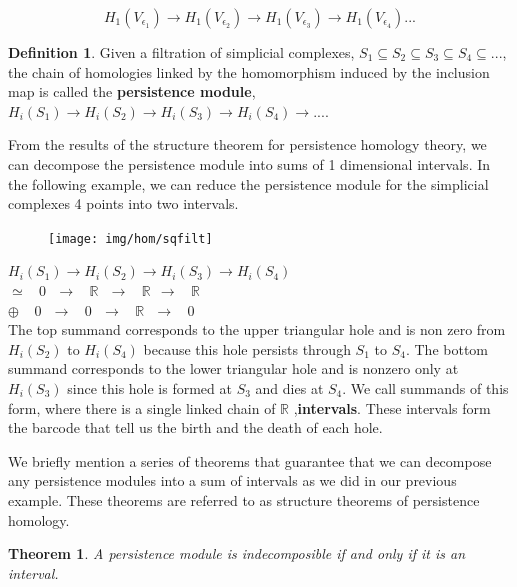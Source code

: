 \documentclass[12pt, a4paper, twocolumn, fullpage]{article}
\theoremstyle{plain}
\newtheorem{thm}{Theorem}[section]
\theoremstyle{definition}
\newtheorem{defn}{Definition}[section]
\theoremstyle{remark}
\begin{document}
 $$ H_1(V_{\epsilon_1}) \rightarrow H_1(V_{\epsilon_2}) \rightarrow H_1(V_{\epsilon_3}) \rightarrow H_1(V_{\epsilon_4}) ...$$
 
\begin{defn}
Given a filtration of simplicial complexes, $S_1 \subseteq S_2 \subseteq S_3 \subseteq S_4 \subseteq ...$, the chain of homologies linked by the homomorphism induced by the inclusion map is called the \textbf{persistence module}, $ H_i(S_1) \rightarrow H_i(S_2) \rightarrow H_i(S_3) \rightarrow H_i(S_4) \rightarrow ...$.
\end{defn}
 
From the results of the structure theorem for persistence homology theory, we can decompose the persistence module into sums of 1 dimensional intervals. In the following example, we can reduce the persistence module for the simplicial complexes 4 points into two intervals.

\begin{figure}[H]
    \texttt{[image: img/hom/sqfilt]}
    \label{sqfilt}
\end{figure}
 $ H_i(S_1) \rightarrow H_i(S_2) \rightarrow H_i(S_3) \rightarrow H_i(S_4)$\\
 $\simeq \ \ \ \   0 \ \ \  \rightarrow \ \ \ \ \mathbb{R} \ \ \ \rightarrow \ \ \ \  \mathbb{R} \ \ \rightarrow \ \ \ \ \mathbb{R}$\\
 $\oplus \ \ \ \ \ 0 \ \ \ \rightarrow \ \ \ \ 0 \ \ \ \rightarrow \ \ \ \  \mathbb{R} \ \ \ \rightarrow \ \ \ \ 0$\\
 
 The top summand corresponds to the upper triangular hole and is non zero from $ H_i(S_2) $ to $ H_i(S_4) $ because this hole persists through $S_1$ to $S_4$. The bottom summand corresponds to the lower triangular hole and is nonzero only at $ H_i(S_3) $ since this hole is formed at $ S_3 $ and dies at $S_4$. We call summands of this form, where there is a single linked chain of $\mathbb{R}$ ,\textbf{intervals}. These intervals form the barcode that tell us the birth and the death of each hole.

We briefly mention a series of theorems that guarantee that we can decompose any persistence modules into a sum of intervals as we did  in our previous example. These theorems are referred to as structure theorems of persistence homology.

\begin{thm}
A persistence module is indecomposible if and only if it is an interval.
\end{thm}
\end{document}
